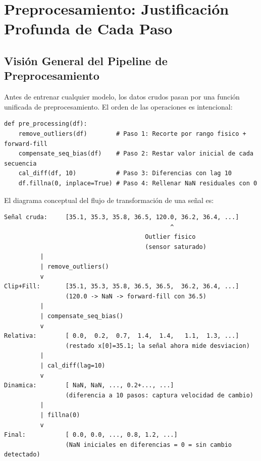 \documentclass[12pt,a4paper]{article}
\begin{document}
\section{Preprocesamiento: Justificaci\'{o}n Profunda de Cada Paso}

\subsection{Visi\'{o}n General del Pipeline de Preprocesamiento}

Antes de entrenar cualquier modelo, los datos crudos pasan por una funci\'{o}n unificada
de preprocesamiento. El orden de las operaciones es intencional:

\begin{lstlisting}[caption={Funci\'{o}n principal de preprocesamiento}, label={lst:preproc}]
def pre_processing(df):
    remove_outliers(df)        # Paso 1: Recorte por rango fisico + forward-fill
    compensate_seq_bias(df)    # Paso 2: Restar valor inicial de cada secuencia
    cal_diff(df, 10)           # Paso 3: Diferencias con lag 10
    df.fillna(0, inplace=True) # Paso 4: Rellenar NaN residuales con 0
\end{lstlisting}

El diagrama conceptual del flujo de transformaci\'{o}n de una se\~{n}al es:

\begin{center}
\begin{verbatim}
Señal cruda:     [35.1, 35.3, 35.8, 36.5, 120.0, 36.2, 36.4, ...]
                                              ^
                                       Outlier fisico
                                       (sensor saturado)
          |
          | remove_outliers()
          v
Clip+Fill:       [35.1, 35.3, 35.8, 36.5, 36.5,  36.2, 36.4, ...]
                 (120.0 -> NaN -> forward-fill con 36.5)
          |
          | compensate_seq_bias()
          v
Relativa:        [ 0.0,  0.2,  0.7,  1.4,  1.4,   1.1,  1.3, ...]
                 (restado x[0]=35.1; la señal ahora mide desviacion)
          |
          | cal_diff(lag=10)
          v
Dinamica:        [ NaN, NaN, ..., 0.2+..., ...]
                 (diferencia a 10 pasos: captura velocidad de cambio)
          |
          | fillna(0)
          v
Final:           [ 0.0, 0.0, ..., 0.8, 1.2, ...]
                 (NaN iniciales en diferencias = 0 = sin cambio detectado)
\end{verbatim}
\end{center}
\end{document}

